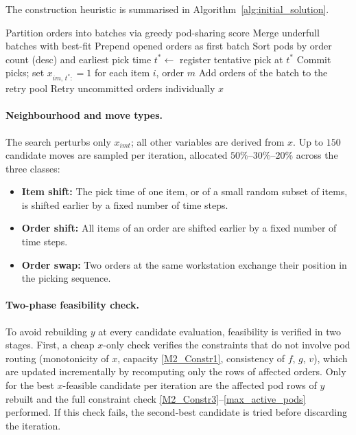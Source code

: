 \documentclass[a4paper,10pt]{article}
\begin{document}
The construction heuristic is summarised in Algorithm~\ref{alg:initial_solution}.

\begin{algorithm}
\caption{Initial Solution Construction}
\label{alg:initial_solution}
\begin{algorithmic}[1]
    \State Partition orders into batches via greedy pod-sharing score
    \State Merge underfull batches with best-fit
    \State Prepend opened orders as first batch
        \State Sort pods by order count (desc) and earliest pick time
            \State $t^* \gets$ 
             register tentative pick at $t^*$ \EndIf
        \EndFor
            \State Commit picks; set $x_{im,\,t^*:} = 1$ for each item $i$, order $m$
        \Else
            \State Add orders of the batch to the retry pool
        \EndIf
    \EndFor
    \State Retry uncommitted orders individually
\EndFor
\State \Return $x$
\end{algorithmic}
\end{algorithm}

\paragraph{Neighbourhood and move types.}
The search perturbs only $x_{imt}$; all other variables are derived from $x$. Up to $150$ candidate moves are sampled per iteration, allocated $50\%$--$30\%$--$20\%$ across the three classes:

\begin{itemize}[noitemsep]
    \item \textbf{Item shift:} The pick time of one item, or of a small random subset of items, is shifted earlier by a fixed number of time steps.
    \item \textbf{Order shift:} All items of an order are shifted earlier by a fixed number of time steps.
    \item \textbf{Order swap:} Two orders at the same workstation exchange their position in the picking sequence.
\end{itemize}

\paragraph{Two-phase feasibility check.}
To avoid rebuilding $y$ at every candidate evaluation, feasibility is verified in two stages. First, a cheap $x$-only check verifies the constraints that do not involve pod routing (monotonicity of $x$, capacity \eqref{M2_Constr1}, consistency of $f$, $g$, $v$), which are updated incrementally by recomputing only the rows of affected orders. Only for the best $x$-feasible candidate per iteration are the affected pod rows of $y$ rebuilt and the full constraint check
\eqref{M2_Constr3}--\eqref{max_active_pods} performed. If this check fails, the second-best candidate is tried before discarding the iteration. 
\end{document}

